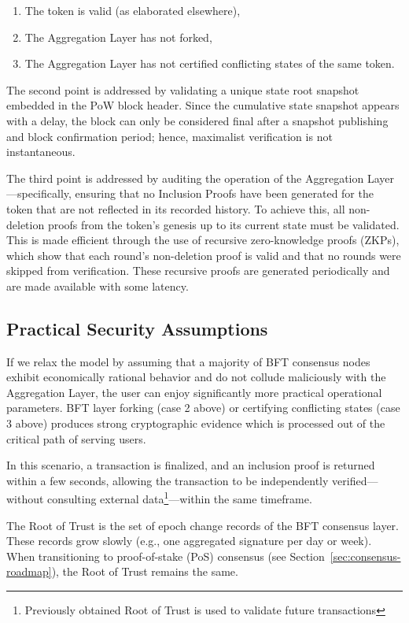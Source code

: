 \documentclass[twocolumn]{article}
\begin{document}
\begin{enumerate}[nosep]
    \item The token is valid (as elaborated elsewhere),
    \item The Aggregation Layer has not forked,
    \item The Aggregation Layer has not certified conflicting states of the same token.
\end{enumerate}

The second point is addressed by validating a unique state root snapshot embedded in the PoW block header. Since the cumulative state snapshot appears with a delay, the block can only be considered final after a snapshot publishing and block confirmation period; hence, maximalist verification is not instantaneous.

The third point is addressed by auditing the operation of the Aggregation Layer—specifically, ensuring that no Inclusion Proofs have been generated for the token that are not reflected in its recorded history. To achieve this, all non-deletion proofs from the token's genesis up to its current state must be validated. This is made efficient through the use of recursive zero-knowledge proofs (ZKPs), which show that each round’s non-deletion proof is valid and that no rounds were skipped from verification. These recursive proofs are generated periodically and are made available with some latency.

\subsection{Practical Security Assumptions}

If we relax the model by assuming that a majority of BFT consensus nodes exhibit economically rational behavior and do not collude maliciously with the Aggregation Layer, the user can enjoy significantly more practical operational parameters. BFT layer forking (case 2 above) or certifying conflicting states (case 3 above) produces strong cryptographic evidence which is processed out of the critical path of serving users.

In this scenario, a transaction is finalized, and an inclusion proof is returned within a few seconds, allowing the transaction to be independently verified—without consulting external data\footnote{Previously obtained Root of Trust is used to validate future transactions}—within the same timeframe.

The Root of Trust is the set of epoch change records of the BFT consensus layer. These records grow slowly (e.g., one aggregated signature per day or week). When transitioning to proof-of-stake (PoS) consensus (see Section~\ref{sec:consensus-roadmap}), the Root of Trust remains the same.
\end{document}
